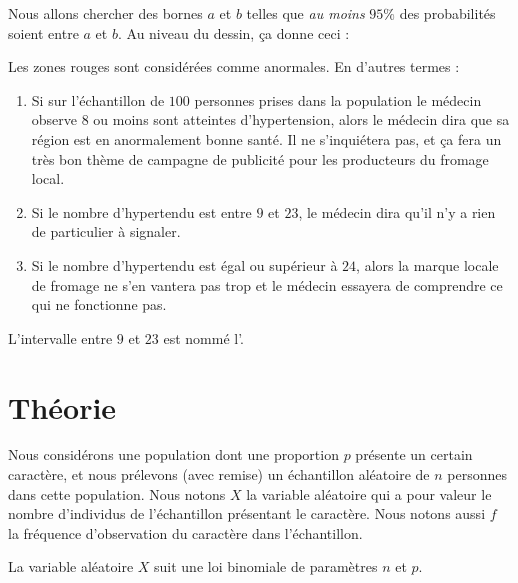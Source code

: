 Nous allons chercher des bornes \( a\) et \( b\) telles que \emph{au moins} \( 95\%\) des probabilités soient entre \( a\) et \( b\). Au niveau du dessin, ça donne ceci :


\begin{center}

\end{center}
Les zones rouges sont considérées comme anormales. En d'autres termes :
\begin{enumerate}
    \item
        Si sur l'échantillon de \( 100\) personnes prises dans la population le médecin observe \( 8\) ou moins sont atteintes d'hypertension, alors le médecin dira que sa région est en anormalement bonne santé. Il ne s'inquiétera pas, et ça fera un très bon thème de campagne de publicité pour les producteurs du fromage local.
    \item
        Si le nombre d'hypertendu est entre \( 9\) et \( 23\), le médecin dira qu'il n'y a rien de particulier à signaler.
    \item
        Si le nombre d'hypertendu est égal ou supérieur à \( 24\), alors la marque locale de fromage ne s'en vantera pas trop et le médecin essayera de comprendre ce qui ne fonctionne pas.
\end{enumerate}
L'intervalle entre \( 9\) et \( 23\) est nommé l'.

\section{Théorie}

Nous considérons une population dont une proportion \( p\)  présente un certain caractère, et nous prélevons (avec remise) un échantillon aléatoire de \( n\) personnes dans cette population. Nous notons \( X\) la variable aléatoire qui a pour valeur le nombre d'individus de l'échantillon présentant le caractère. Nous notons aussi \( f\) la fréquence d'observation du caractère dans l'échantillon.

La variable aléatoire \( X\) suit une loi binomiale de paramètres \( n\) et \( p\). 

